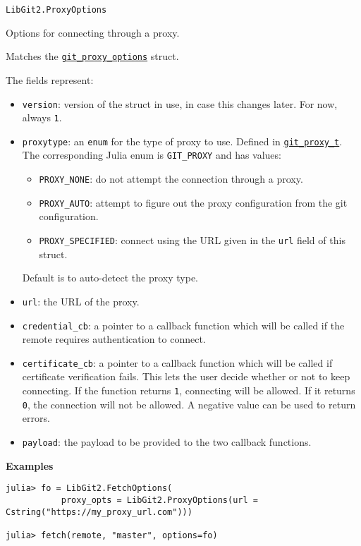 \begin{adjustwidth}{2em}{0pt}


\begin{verbatim}
LibGit2.ProxyOptions
\end{verbatim}

Options for connecting through a proxy.

Matches the \href{https://libgit2.org/libgit2/\#HEAD/type/git\_proxy\_options}{\texttt{git\_proxy\_options}} struct.

The fields represent:

\begin{itemize}
\item \texttt{version}: version of the struct in use, in case this changes later. For now, always \texttt{1}.


\item \texttt{proxytype}: an \texttt{enum} for the type of proxy to use.  Defined in \href{https://libgit2.org/libgit2/\#HEAD/type/git\_proxy\_t}{\texttt{git\_proxy\_t}}.  The corresponding Julia enum is \texttt{GIT\_PROXY} and has values:

\begin{itemize}
\item \texttt{PROXY\_NONE}: do not attempt the connection through a proxy.


\item \texttt{PROXY\_AUTO}: attempt to figure out the proxy configuration from the git configuration.


\item \texttt{PROXY\_SPECIFIED}: connect using the URL given in the \texttt{url} field of this struct.

\end{itemize}
Default is to auto-detect the proxy type.


\item \texttt{url}: the URL of the proxy.


\item \texttt{credential\_cb}: a pointer to a callback function which will be called if the remote requires authentication to connect.


\item \texttt{certificate\_cb}: a pointer to a callback function which will be called if certificate verification fails. This lets the user decide whether or not to keep connecting. If the function returns \texttt{1}, connecting will be allowed. If it returns \texttt{0}, the connection will not be allowed. A negative value can be used to return errors.


\item \texttt{payload}: the payload to be provided to the two callback functions.

\end{itemize}
\textbf{Examples}


\begin{verbatim}
julia> fo = LibGit2.FetchOptions(
           proxy_opts = LibGit2.ProxyOptions(url = Cstring("https://my_proxy_url.com")))

julia> fetch(remote, "master", options=fo)
\end{verbatim}



\end{adjustwidth}
